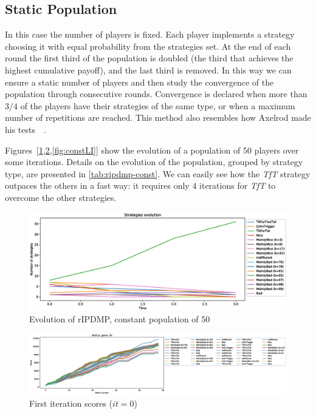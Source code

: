 \documentclass[journal,a4paper,10pt,twoside]{IEEEtran} %
\begin{document}
\subsection{Static Population}
In this case the number of players is fixed. Each player implements a strategy choosing it with equal probability from the strategies set. At the end of each round the first third of the population is doubled (the third that achieves the highest cumulative payoff), and the last third is removed. In this way we can ensure a static number of players and then study the convergence of the population through consecutive rounds.
Convergence is declared when more than $3/4$ of the players have their strategies of the same type, or when a maximum number of repetitions are reached.
This method also resembles how Axelrod made his tests~\cite[\S 2.6]{mathieu2017}~\cite{axelrod1984evolution}.

Figures~[\ref{fig:constR},\ref{fig:constFI},\ref{fig:constLI}] show the evolution of a population of 50 players over some iterations.
Details on the evolution of the population, grouped by strategy type, are presented in \autoref{tab:ripdmp-const}.
We can easily see how the \textit{TfT} strategy outpaces the others in a fast way: it requires only $4$ iterations for \textit{TfT} to overcome the other strategies.

\begin{figure}[!ht]
    \centering
    \includegraphics[width=1\columnwidth]{../img/ripdmp-const/ripdmp-evolution-const-pop-50}
    \caption{Evolution of rIPDMP, constant population of 50}
    \label{fig:constR}
\end{figure}

\begin{figure}[!ht]
    \centering
    \includegraphics[width=1\columnwidth]{../img/ripdmp-const/ripdmp-scores-const-pop-50-r0}
    \caption{First iteration scores ($it=0$)}
    \label{fig:constFI}
\end{figure}
\end{document}
